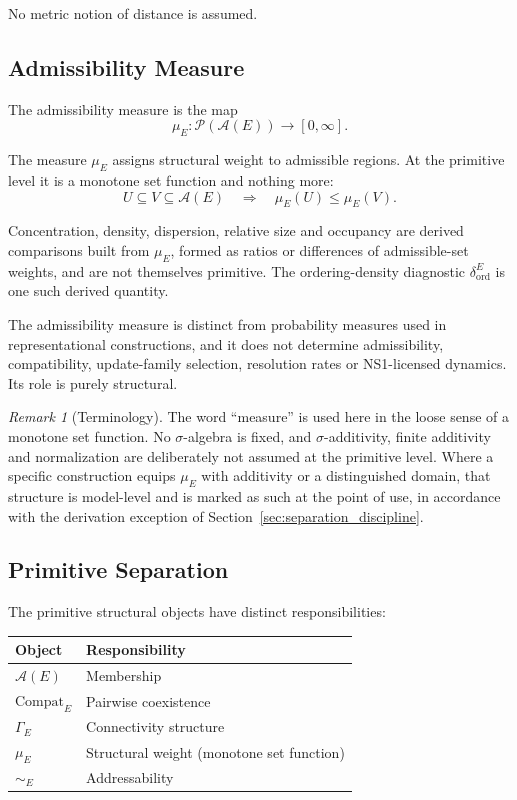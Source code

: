 \documentclass[aps,prx,onecolumn,11pt]{revtex4-2}
\theoremstyle{plain}
\theoremstyle{definition}
\theoremstyle{remark}
\newtheorem{remark}{Remark}
\begin{document}
No metric notion of distance is assumed.

\subsection{Admissibility Measure}
\label{subsec:admissibility_measure}

The admissibility measure is the map
\[
\mu_E :
\mathcal{P}(\mathcal{A}(E))
\rightarrow
[0,\infty].
\]

The measure \(\mu_E\) assigns structural weight to admissible regions.
At the primitive level it is a monotone set function and nothing more:
\[
U\subseteq V\subseteq\mathcal A(E)
\quad\Longrightarrow\quad
\mu_E(U)\leq \mu_E(V).
\]

Concentration, density, dispersion, relative size and occupancy are
derived comparisons built from \(\mu_E\), formed as ratios or
differences of admissible-set weights, and are not themselves
primitive. The ordering-density diagnostic
\(\delta^{E}_{\mathrm{ord}}\) is one such derived quantity.

The admissibility measure is distinct from probability measures used in
representational constructions, and it does not determine
admissibility, compatibility, update-family selection, resolution rates
or NS1-licensed dynamics. Its role is purely structural.

\begin{remark}[Terminology]
The word ``measure'' is used here in the loose sense of a monotone set
function. No $\sigma$-algebra is fixed, and $\sigma$-additivity,
finite additivity and normalization are deliberately not assumed at
the primitive level. Where a specific construction equips $\mu_E$ with
additivity or a distinguished domain, that structure is model-level
and is marked as such at the point of use, in accordance with the
derivation exception of
Section~\ref{sec:separation_discipline}.
\end{remark}

\subsection{Primitive Separation}
\label{subsec:primitive_separation}

The primitive structural objects have distinct responsibilities:

\begin{center}
\begin{tabular}{ll}
\hline
Object & Responsibility \\
\hline
\(\mathcal{A}(E)\) & Membership \\
\(\mathrm{Compat}_E\) & Pairwise coexistence \\
\(\Gamma_E\) & Connectivity structure \\
\(\mu_E\) & Structural weight (monotone set function) \\
\(\sim_E\) & Addressability \\
\hline
\end{tabular}
\end{center}
\end{document}
